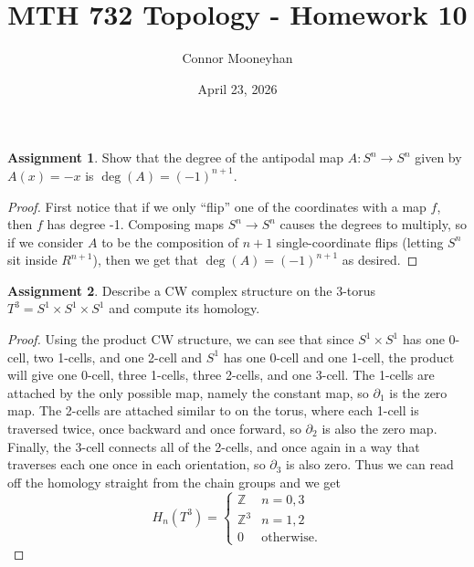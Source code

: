 \documentclass[12pt]{article}
\title{MTH 732 Topology - Homework 10}
\author{Connor Mooneyhan}
\date{April 23, 2026}
\theoremstyle{definition}
\newtheorem{ex}{Assignment}
\begin{document}
\maketitle

\begin{ex}
	Show that the degree of the antipodal map $A : S^n \to S^n$ given by $A(x) = -x$ is $\deg(A) = (-1)^{n+1}$.
\end{ex}
\begin{proof}
  First notice that if we only ``flip'' one of the coordinates with a map $f$, then $f$ has degree -1.
  Composing maps $S^n \to S^n$ causes the degrees to multiply, so if we consider $A$ to be the composition of $n+1$ single-coordinate flips (letting $S^n$ sit inside $R^{n+1}$), then we get that $\deg(A) = (-1)^{n+1}$ as desired.
\end{proof}

\begin{ex}
	Describe a CW complex structure on the 3-torus $T^3 = S^1\times S^1 \times S^1$ and compute its homology.
\end{ex}
\begin{proof}
	Using the product CW structure, we can see that since $S^1 \times S^1$ has one 0-cell, two 1-cells, and one 2-cell and $S^1$ has one 0-cell and one 1-cell, the product will give one 0-cell, three 1-cells, three 2-cells, and one 3-cell.
	The 1-cells are attached by the only possible map, namely the constant map, so $\partial_1$ is the zero map.
	The 2-cells are attached similar to on the torus, where each 1-cell is traversed twice, once backward and once forward, so $\partial_2$ is also the zero map.
	Finally, the 3-cell connects all of the 2-cells, and once again in a way that traverses each one once in each orientation, so $\partial_3$ is also zero.
	Thus we can read off the homology straight from the chain groups and we get \begin{equation*}
		H_n(T^3) = \begin{cases}
			\mathbb{Z}   & n = 0, 3         \\
			\mathbb{Z}^3 & n = 1, 2         \\
			0            & \text{otherwise}.
		\end{cases}
	\end{equation*}
\end{proof}
\end{document}
